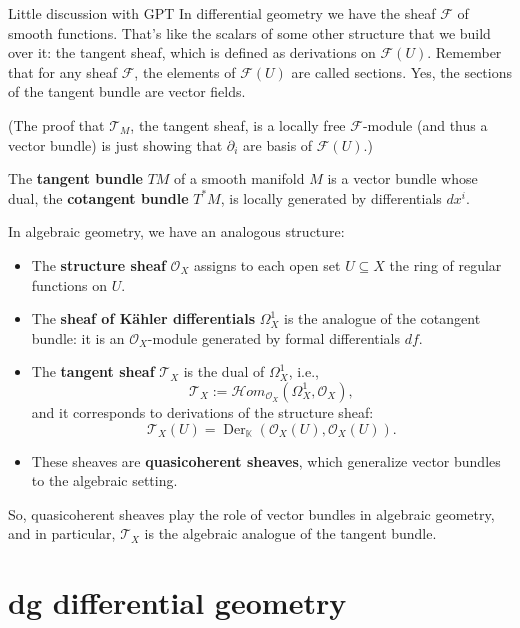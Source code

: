 \begin{thing6}{Little discussion with GPT}\leavevmode
In differential geometry we have the sheaf \(\mathcal{F}\) of smooth functions. That's like the scalars of some other structure that we build over it: the tangent sheaf, which is defined as derivations on \(\mathcal{F}(U)\). Remember that for any sheaf \(\mathcal{F}\), the elements of \(\mathcal{F}(U)\) are called sections. Yes, the sections of the tangent bundle are vector fields.

(The proof that \(\mathcal{T}_M\), the tangent sheaf, is a locally free \(\mathcal{F}\)-module (and thus a vector bundle) is just showing that \(\partial_i\) are basis of \(\mathcal{F}(U)\).)

The \textbf{tangent bundle} $TM$ of a smooth manifold $M$ is a vector bundle whose dual, the \textbf{cotangent bundle} $T^*M$, is locally generated by differentials $dx^i$.

	In algebraic geometry, we have an analogous structure:

\begin{itemize}
  \item The \textbf{structure sheaf} $\mathcal{O}_X$ assigns to each open set $U \subseteq X$ the ring of regular functions on $U$.
  \item The \textbf{sheaf of Kähler differentials} $\Omega^1_X$ is the analogue of the cotangent bundle: it is an $\mathcal{O}_X$-module generated by formal differentials $df$.
  \item The \textbf{tangent sheaf} $\mathcal{T}_X$ is the dual of $\Omega^1_X$, i.e.,
  \[
  \mathcal{T}_X := \mathcal{H}om_{\mathcal{O}_X}(\Omega^1_X, \mathcal{O}_X),
  \]
  and it corresponds to derivations of the structure sheaf:
  \[
  \mathcal{T}_X(U) = \operatorname{Der}_{\mathbb{K}}(\mathcal{O}_X(U), \mathcal{O}_X(U)).
  \]
  \item These sheaves are \textbf{quasicoherent sheaves}, which generalize vector bundles to the algebraic setting.
\end{itemize}

So, quasicoherent sheaves play the role of vector bundles in algebraic geometry, and in particular, $\mathcal{T}_X$ is the algebraic analogue of the tangent bundle.
\end{thing6}

\chapter{dg differential geometry}

